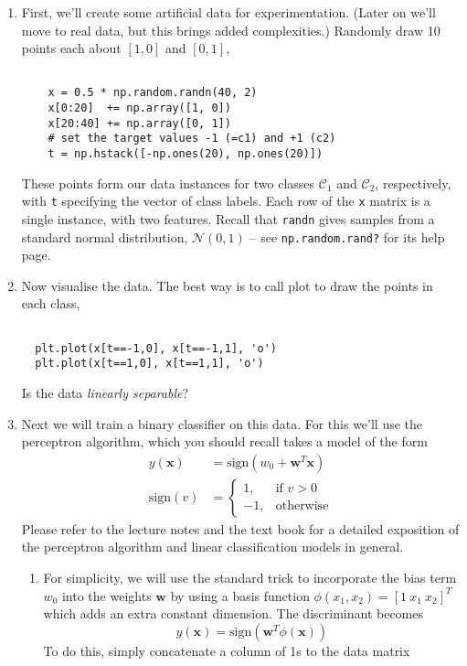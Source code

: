 \documentclass{article}
\begin{document}
\begin{enumerate}
\item First, we'll create some artificial data for experimentation. (Later on we'll move to real data, but this brings added complexities.) Randomly draw 10 points each about $[1, 0]$ and $[0, 1]$,
\begin{verbatim}

    x = 0.5 * np.random.randn(40, 2)
    x[0:20]  += np.array([1, 0])
    x[20:40] += np.array([0, 1])
    # set the target values -1 (=c1) and +1 (c2)
    t = np.hstack([-np.ones(20), np.ones(20)])
\end{verbatim}
These points form our data instances for two classes $\mathcal{C}_1$ and $\mathcal{C}_2$, respectively, with \texttt{t} specifying the vector of class labels.
Each row of the \texttt{x} matrix is a single instance, with two features.
Recall that \texttt{randn} gives samples from a standard normal distribution, $\mathcal{N}(0, 1)$ -- see \texttt{np.random.rand?} for its help page.

\item Now visualise the data. The best way is to call plot to draw the points in each class, 
\begin{verbatim}

  plt.plot(x[t==-1,0], x[t==-1,1], 'o')
  plt.plot(x[t==1,0], x[t==1,1], 'o')
\end{verbatim}
Is the data \emph{linearly separable}?

\item Next we will train a binary classifier on this data. For this we'll use the perceptron algorithm,
which you should recall takes a model of the form
\begin{align*}
 y(\mathbf{x}) &= \mbox{sign}(w_0 + \mathbf{w}^T \mathbf{x}) \\
 \mbox{sign}(v) &= \left\{ 
\begin{array}{cc} 
1, & \mbox{if $v > 0$} \\
-1, &  \mbox{otherwise}
\end{array} \right .
\end{align*}
Please refer to the lecture notes and the text book for a detailed exposition of the perceptron algorithm and linear classification models in general.

\begin{enumerate}
\item For simplicity, we will use the standard trick to incorporate the bias term $w_0$ into the weights $\mathbf{w}$ by using a basis function $\phi(x_1, x_2) = [1~x_1~x_2]^T$ which adds an extra constant dimension. The discriminant becomes
\begin{equation} y(\mathbf{x}) = \mbox{sign}(\mathbf{w}^T \phi(\mathbf{x})) \label{eq:pred} \end{equation}
To do this, simply concatenate a column of 1s to the data matrix
\begin{verbatim}


\end{verbatim}
\end{enumerate}
\end{enumerate}
\end{document}
